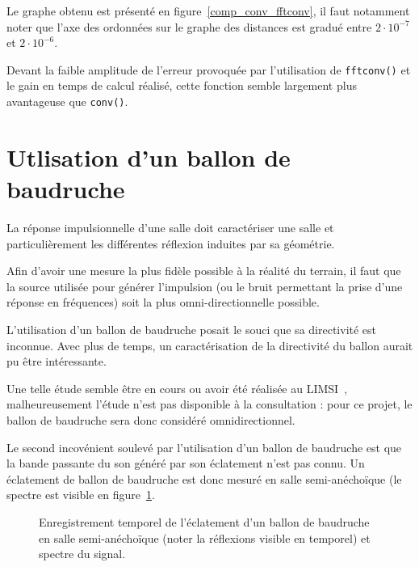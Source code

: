 Le graphe obtenu est présenté en figure~\ref{comp_conv_fftconv}, il faut notamment noter que l'axe des ordonnées sur
le graphe des distances est gradué entre $2\cdot10^{-7}$ et $2\cdot10^{-6}$.

Devant la faible amplitude de l'erreur provoquée par l'utilisation de \texttt{fftconv()} et le gain en temps de calcul
réalisé, cette fonction semble largement plus avantageuse que \texttt{conv()}.

\section{Utlisation d'un ballon de baudruche} %

La réponse impulsionnelle d'une salle doit caractériser une salle et particulièrement les différentes réflexion induites
par sa géométrie.

Afin d'avoir une mesure la plus fidèle possible à la réalité du terrain, il faut que la source utilisée pour générer
l'impulsion (ou le bruit permettant la prise d'une réponse en fréquences) soit la plus omni-directionnelle possible.

L'utilisation d'un ballon de baudruche posait le souci que sa directivité est inconnue. Avec plus de temps, un
caractérisation de la directivité du ballon aurait pu être intéressante.

Une telle étude semble être en cours ou avoir été réalisée au LIMSI~\cite{Bru10}, malheureusement l'étude n'est pas
disponible à la consultation : pour ce projet, le ballon de baudruche sera donc considéré omnidirectionnel.

Le second incovénient soulevé par l'utilisation d'un ballon de baudruche est que la bande passante du son généré par
son éclatement n'est pas connu. Un éclatement de ballon de baudruche est donc mesuré en salle semi-anéchoïque (le
spectre est visible en figure~\ref{spk_ballon_anecho}.

\begin{figure}[h!]
\caption{\label{spk_ballon_anecho}Enregistrement temporel de l'éclatement d'un ballon de baudruche en salle
semi-anéchoïque (noter la réflexions visible en temporel) et spectre du signal.}
\end{figure}

